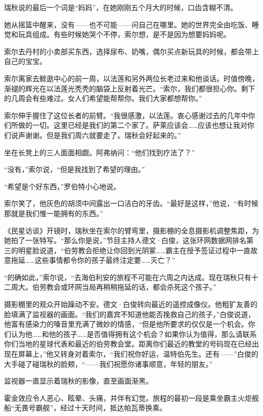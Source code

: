 \documentclass[AutoFakeBold=true]{book}
\begin{document}
\vspace*{1em}

瑞秋说的最后一个词是``妈妈''，在她刚刚五个月大的时候，口齿含糊不清。

她从摇篮中醒来，没有——也不可能——问自己在哪里。她的世界完全由吃饭、睡觉和玩具组成。有些时候她哭个不停，索尔想，是不是因为想要妈妈呢。

索尔去丹村的小卖部买东西，选择尿布、奶嘴，偶尔买点新玩具的时候，都会带上自己的宝宝。

索尔离家去鲸逖中心的前一周，以法莲和另外两位长老过来和他谈话。时值傍晚，渐褪的辉光在以法莲光秃秃的脑袋上反射着光芒。``索尔，我们都很担心你。剩下的几周会有些难过。女人们希望能帮帮你。我们大家都想帮你。''

索尔伸手握住了这位长者的前臂。``我很感激，以法莲。衷心感谢过去的几年中你们所做的一切。这里已经是我们的第二个家了。萨莱应该会……应该也想让我对你们说声谢谢。但是我们周六就要走了。瑞秋会好起来的。''

坐在长凳上的三人面面相觑。阿弗纳问：``他们找到疗法了？''

``没有，''索尔说，``但是我找到了希望的理由。''

``希望是个好东西，''罗伯特小心地说。

索尔笑了，他灰色的胡须中间露出一口洁白的牙齿。``最好是这样，''他说，``有时候那就是我们惟一能拥有的东西。''

《民星访谈》开镜时，瑞秋坐在索尔的臂弯里，摄影棚的全息摄影机调整焦距，为她拍了一张特写。``那么你是说，''节目主持人德文·白俊，这张环网数据网排名第三的明星脸说道，``伯劳教会拒绝让你回到光阴冢……霸主在授予签证过程中一直故意拖延……这些事情都令你的孩子最终注定要……灭亡？''

``的确如此，''索尔说，``去海伯利安的旅程不可能在六周之内达成。现在瑞秋只有十二周大。伯劳教会或环网当局再稍稍拖延的话，都会杀死这个孩子。''

摄影棚里的观众开始躁动不安。德文·白俊转向最近的遥控成像仪。他粗犷友善的脸填满了监视器的画面。``我们的嘉宾不知道他能否挽救自己的孩子，''白俊说道，他富有感染力的嗓音里充满了微妙的情感，``但是他所要求的仅仅是一个机会。你们认为他……和他的孩子……是否值得拥有这个机会？如果你认为值得，那么请联系你们当地的星球代表和最近的伯劳教会堂。距离你们最近的教堂的号码现在已经出现在屏幕上，''他又转身对着索尔，``我们祝你好运，温特伯先生。还有——''白俊的大手碰了碰瑞秋的脸颊，``——我们祝愿你诸事顺意，年轻的朋友。''

监视器一直显示着瑞秋的影像，直至画面渐黑。

\vspace*{1em}

霍金效应令人恶心、眩晕、头痛，并伴有幻觉。旅程的最初一段是乘坐霸主火炬舰船``无畏号霸舰''，经过十天时间，抵达帕瓦蒂换乘。
\end{document}
